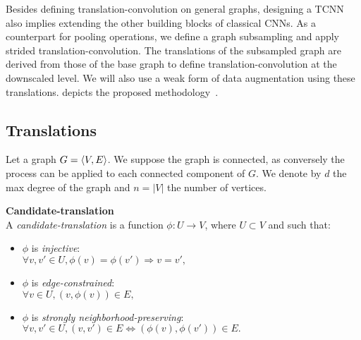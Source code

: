 Besides defining translation-convolution on general graphs, designing a TCNN also implies extending the other building blocks of classical CNNs. As a counterpart for pooling operations, we define a graph subsampling and apply strided translation-convolution. The translations of the subsampled graph are derived from those of the base graph to define translation-convolution at the downscaled level. We will also use a weak form of data augmentation using these translations.  depicts the proposed methodology~\citep{lassance2018matching}.



\subsection{Translations}



Let a graph $G = \langle V, E \rangle$. We suppose the graph is connected, as conversely the process can be applied to each connected component of $G$. We denote by $d$ the max degree of the graph and $n = |V|$ the number of vertices.

\begin{definition}\textbf{Candidate-translation}\\
  A \emph{candidate-translation} is a function $\phi: U \to V$, where $U \subset V$ and such that:
  \begin{itemize}[noitemsep,nolistsep]
  \item $\phi$ is \emph{injective}:\\
  $\forall v,v' \in U, \phi(v) = \phi(v') \Rightarrow v = v',$
  \item $\phi$ is \emph{edge-constrained}:\\
  $\forall v \in U, (v,\phi(v)) \in E,$
  \item $\phi$ is \emph{strongly neighborhood-preserving}:\\
  $\forall v,v' \in U, (v,v')\in E \Leftrightarrow (\phi(v),\phi(v')) \in E.$
  \end{itemize}
\end{definition}


